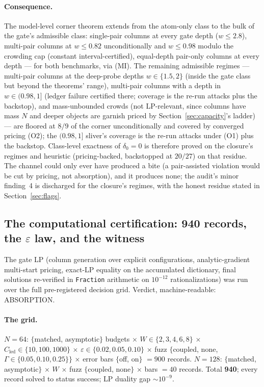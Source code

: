 \documentclass[11pt]{article}
\theoremstyle{plain}
\theoremstyle{definition}
\theoremstyle{remark}
\newcommand{\Cled}{C_{\mathrm{led}}}
\begin{document}
\paragraph{Consequence.}
The model-level corner theorem extends from the atom-only class to the bulk of
the gate's admissible class: single-pair columns at every gate depth
($w \le 2.8$), multi-pair columns at $w \le 0.82$ unconditionally and
$w \le 0.98$ modulo the crowding cap (constant interval-certified), equal-depth
pair-only columns at every depth --- for both benchmarks, via (MI). The remaining
admissible regimes --- multi-pair columns at the deep-probe depths
$w \in \{1.5, 2\}$ (inside the gate class but beyond the theorems' range),
multi-pair columns with a depth in $w \in (0.98, 1]$ (ledger failure certified
there; coverage is the re-run attacks plus the backstop), and mass-unbounded
crowds (not LP-relevant, since columns have mass $N$ and deeper objects are
garnish priced by Section~\ref{sec:capacity}'s ladder) --- are floored at $8/9$
of the corner unconditionally and covered by converged pricing (O2); the
$(0.98, 1]$ sliver's coverage is the re-run attacks under (O1) plus the backstop.
Class-level exactness of $\delta_0 = 0$ is therefore proved on the closure's
regimes and heuristic (pricing-backed, backstopped at $20/27$) on that residue.
The channel could only ever have produced a bite (a pair-assisted violation would
be cut by pricing, not absorption), and it produces none; the audit's minor
finding~4 is discharged for the closure's regimes, with the honest residue stated
in Section~\ref{sec:flags}.

\subsection[The computational certification: 940 records, the epsilon law, and
the witness]{The computational certification: 940 records, the $\varepsilon$
law, and the witness}
\label{sec:certification}

The gate LP (column generation over explicit configurations, analytic-gradient
multi-start pricing, exact-LP equality on the accumulated dictionary, final
solutions re-verified in \texttt{Fraction} arithmetic on $10^{-12}$
rationalizations) was run over the full pre-registered decision grid. Verdict,
machine-readable: ABSORPTION.

\paragraph{The grid.}
$N = 64$: $\{$matched, asymptotic$\}$ budgets $\times$
$W \in \{2, 3, 4, 6, 8\}$ $\times$ $\Cled \in \{10, 100, 1000\}$ $\times$
$\varepsilon \in \{0.02, 0.05, 0.10\}$ $\times$ fuzz $\{$coupled, none,
$\Gamma \in \{0.05, 0.10, 0.25\}\}$ $\times$ error bars $\{$off, on$\}$ $= 900$
records. $N = 128$: $\{$matched, asymptotic$\}$ $\times$ $W$ $\times$ fuzz
$\{$coupled, none$\}$ $\times$ bars $= 40$ records. Total \textbf{940}; every
record solved to status success; LP duality gap ${\sim}10^{-9}$.
\end{document}
